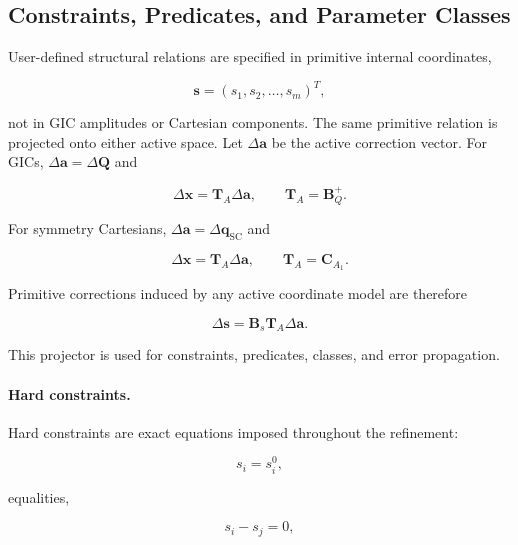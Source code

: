 \documentclass[journal=jctcce,manuscript=article,maxauthors=999]{achemso}
\begin{document}
\subsection{Constraints, Predicates, and Parameter Classes}

User-defined structural relations are specified in primitive internal
coordinates,

\begin{equation}
\mathbf{s} = (s_1,s_2,\ldots,s_m)^T ,
\end{equation}

not in GIC amplitudes or Cartesian components. The same primitive relation is
projected onto either active space. Let $\Delta\mathbf{a}$ be the active
correction vector. For GICs, $\Delta\mathbf{a}=\Delta\mathbf{Q}$ and

\begin{equation}
\Delta\mathbf{x}
=
\mathbf{T}_{A}\Delta\mathbf{a},
\qquad
\mathbf{T}_{A}=\mathbf{B}_{Q}^{+}.
\end{equation}

For symmetry Cartesians, $\Delta\mathbf{a}=\Delta\mathbf{q}_{\mathrm{SC}}$ and

\begin{equation}
\Delta\mathbf{x}
=
\mathbf{T}_{A}\Delta\mathbf{a},
\qquad
\mathbf{T}_{A}=\mathbf{C}_{A_1}.
\end{equation}

Primitive corrections induced by any active coordinate model are therefore

\begin{equation}
\Delta\mathbf{s}
=
\mathbf{B}_s
\mathbf{T}_{A}
\Delta\mathbf{a}.
\end{equation}

This projector is used for constraints, predicates, classes, and error
propagation.

\paragraph{Hard constraints.}

Hard constraints are exact equations imposed throughout the refinement:

\begin{equation}
s_i=s_i^{0},
\end{equation}

equalities,

\begin{equation}
s_i-s_j=0,
\end{equation}
\end{document}
